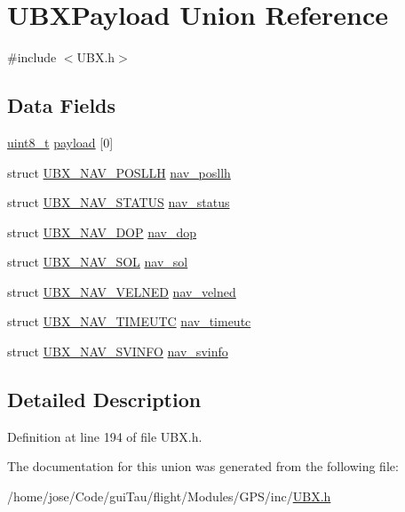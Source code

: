 \hypertarget{union_u_b_x_payload}{\section{U\-B\-X\-Payload Union Reference}
\label{union_u_b_x_payload}
}


{\ttfamily \#include $<$U\-B\-X.\-h$>$}

\subsection*{Data Fields}
\begin{DoxyCompactItemize}
\item 
\hyperlink{stdint_8h_aba7bc1797add20fe3efdf37ced1182c5}{uint8\-\_\-t} \hyperlink{group___g_s_p_module_ga1aaa9f05bb8d9cec08462c71aedeb224}{payload} \mbox{[}0\mbox{]}
\item 
struct \hyperlink{struct_u_b_x___n_a_v___p_o_s_l_l_h}{U\-B\-X\-\_\-\-N\-A\-V\-\_\-\-P\-O\-S\-L\-L\-H} \hyperlink{group___g_s_p_module_gac43eeda1b5ade727f5856e57ae8d4fdb}{nav\-\_\-posllh}
\item 
struct \hyperlink{struct_u_b_x___n_a_v___s_t_a_t_u_s}{U\-B\-X\-\_\-\-N\-A\-V\-\_\-\-S\-T\-A\-T\-U\-S} \hyperlink{group___g_s_p_module_ga10f246cbf1341ebaca17da26a61eb344}{nav\-\_\-status}
\item 
struct \hyperlink{struct_u_b_x___n_a_v___d_o_p}{U\-B\-X\-\_\-\-N\-A\-V\-\_\-\-D\-O\-P} \hyperlink{group___g_s_p_module_gaabf42aafbe0f26fe6224cd255ddfcbd3}{nav\-\_\-dop}
\item 
struct \hyperlink{struct_u_b_x___n_a_v___s_o_l}{U\-B\-X\-\_\-\-N\-A\-V\-\_\-\-S\-O\-L} \hyperlink{group___g_s_p_module_gaba19134cfa2bf927f5ae568a4d1fa82f}{nav\-\_\-sol}
\item 
struct \hyperlink{struct_u_b_x___n_a_v___v_e_l_n_e_d}{U\-B\-X\-\_\-\-N\-A\-V\-\_\-\-V\-E\-L\-N\-E\-D} \hyperlink{group___g_s_p_module_gae525d323fa4053d1f5441bae99d81a95}{nav\-\_\-velned}
\item 
struct \hyperlink{struct_u_b_x___n_a_v___t_i_m_e_u_t_c}{U\-B\-X\-\_\-\-N\-A\-V\-\_\-\-T\-I\-M\-E\-U\-T\-C} \hyperlink{group___g_s_p_module_gaf65229991956493628326aa718c2e156}{nav\-\_\-timeutc}
\item 
struct \hyperlink{struct_u_b_x___n_a_v___s_v_i_n_f_o}{U\-B\-X\-\_\-\-N\-A\-V\-\_\-\-S\-V\-I\-N\-F\-O} \hyperlink{group___g_s_p_module_gae82725b3f4df8d06429de80876bd7bb4}{nav\-\_\-svinfo}
\end{DoxyCompactItemize}


\subsection{Detailed Description}


Definition at line 194 of file U\-B\-X.\-h.



The documentation for this union was generated from the following file\-:\begin{DoxyCompactItemize}
\item 
/home/jose/\-Code/gui\-Tau/flight/\-Modules/\-G\-P\-S/inc/\hyperlink{_u_b_x_8h}{U\-B\-X.\-h}\end{DoxyCompactItemize}
